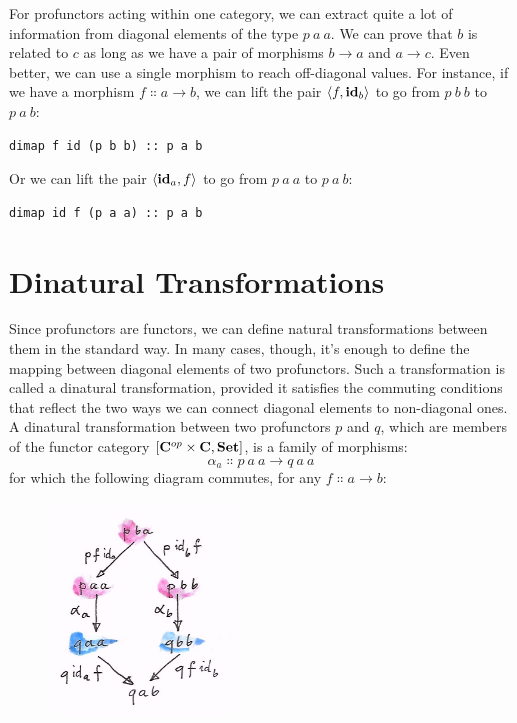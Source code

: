 For profunctors acting within one category, we can extract quite a lot
of information from diagonal elements of the type $p\ a\ a$. We
can prove that $b$ is related to $c$ as long as we have a
pair of morphisms $b \to a$ and
$a \to c$. Even better, we can use a single morphism to
reach off-diagonal values. For instance, if we have a morphism
$f \Colon a \to b$, we can lift the pair
$\langle f, \idarrow[b] \rangle$ to go from $p\ b\ b$ to
$p\ a\ b$:

\begin{Verbatim}
dimap f id (p b b) :: p a b
\end{Verbatim}
Or we can lift the pair $\langle \idarrow[a], f \rangle$ to go
from $p\ a\ a$ to $p\ a\ b$:

\begin{Verbatim}
dimap id f (p a a) :: p a b
\end{Verbatim}

\section{Dinatural Transformations}

Since profunctors are functors, we can define natural transformations
between them in the standard way. In many cases, though, it's enough to
define the mapping between diagonal elements of two profunctors. Such a
transformation is called a dinatural transformation, provided it
satisfies the commuting conditions that reflect the two ways we can
connect diagonal elements to non-diagonal ones. A dinatural
transformation between two profunctors $p$ and $q$, which
are members of the functor category ${[}\cat{C}^{op}\times{}\cat{C}, \Set{]}$, is a
family of morphisms:
\[\alpha_a \Colon p\ a\ a \to q\ a\ a\]
for which the following diagram commutes, for any $f \Colon a \to b$:

\begin{figure}[H]
\centering
\includegraphics[width=50mm]{images/end.jpg}
\end{figure}

